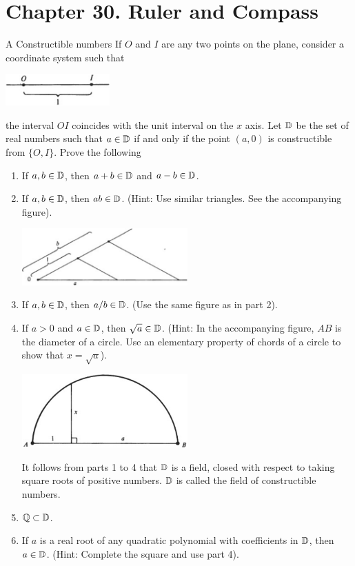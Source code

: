 \section*{Chapter 30. Ruler and Compass}


\begin{exercise}{A Constructible numbers}
If $O$ and $I$ are any two points on the plane, consider a coordinate system such that

{\centering\includegraphics[width=0.3\textwidth]{pinter/assets/ch30-a-1.png}\par}

the interval $OI$ coincides with the unit interval on the $x$ axis. Let $\mathbb{D}$ be the set of real numbers such that $a\in\mathbb{D}$ if and only if the point $(a,0)$ is constructible from $\{O,I\}$. Prove the following
\begin{enumerate}
    \item If $a,b\in\mathbb{D}$, then $a+b\in\mathbb{D}$ and $a-b\in\mathbb{D}$.
    \item If $a,b\in\mathbb{D}$, then $ab\in\mathbb{D}$. (Hint: Use similar triangles. See the accompanying figure).
    
    {\centering\includegraphics[width=0.5\textwidth]{pinter/assets/ch30-a-2.png}\par}
    \item If $a,b\in\mathbb{D}$, then $a/b\in\mathbb{D}$. (Use the same figure as in part 2).
    \item If $a>0$ and $a\in\mathbb{D}$, then $\sqrt{a}\in\mathbb{D}$. (Hint: In the accompanying figure, $AB$ is the diameter of a circle. Use an elementary property of chords of a circle to show that $x=\sqrt{a}$).
    
    {\centering\includegraphics[width=0.5\textwidth]{pinter/assets/ch30-a-3.png}\par}

    It follows from parts 1 to 4 that $\mathbb{D}$ is a field, closed with respect to taking square roots of positive numbers. $\mathbb{D}$ is called the field of constructible numbers.
    \item $\mathbb{Q}\subset\mathbb{D}$.
    \item If $a$ is a real root of any quadratic polynomial with coefficients in $\mathbb{D}$, then $a\in\mathbb{D}$. (Hint: Complete the square and use part 4).
\end{enumerate}
\end{exercise}
